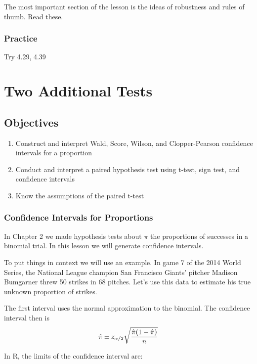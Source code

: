 \documentclass[]{book}
\providecommand{\tightlist}{%
  \setlength{\itemsep}{0pt}\setlength{\parskip}{0pt}}
\theoremstyle{definition}
\theoremstyle{definition}
\theoremstyle{definition}
\theoremstyle{remark}
\begin{document}
The most important section of the lesson is the ideas of robustness and
rules of thumb. Read these.

\subsubsection{Practice}\label{practice-9}

Try 4.29, 4.39

\hypertarget{L23}{\section{Two Additional Tests}\label{L23}}

\subsection{Objectives}\label{objectives-22}

\begin{enumerate}
\def\labelenumi{\arabic{enumi}.}
\tightlist
\item
  Construct and interpret Wald, Score, Wilson, and Clopper-Pearson
  confidence intervals for a proportion
\item
  Conduct and interpret a paired hypothesis test using t-test, sign
  test, and confidence intervals
\item
  Know the assumptions of the paired t-test
\end{enumerate}

\subsubsection{Confidence Intervals for
Proportions}\label{confidence-intervals-for-proportions}

In Chapter 2 we made hypothesis tests about \(\pi\) the proportions of
successes in a binomial trial. In this lesson we will generate
confidence intervals.

To put things in context we will use an example. In game 7 of the 2014
World Series, the National League champion San Francisco Giants' pitcher
Madison Bumgarner threw 50 strikes in 68 pitches. Let's use this data to
estimate his true unknown proportion of strikes.

The first interval uses the normal approximation to the binomial. The
confidence interval then is
\[\hat{\pi} \pm z_{\alpha /2}\sqrt{ {\hat{\pi}(1-\hat{\pi}) \over n}}\]

In R, the limits of the confidence interval are:
\end{document}
